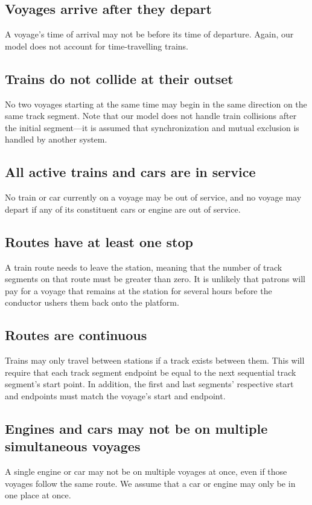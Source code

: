 \documentclass[a4paper]{article}
\begin{document}
\subsection*{Voyages arrive after they depart}
A voyage’s time of arrival may not be before its time of departure. Again, our model does not account for time-travelling trains.

\subsection*{Trains do not collide at their outset}
No two voyages starting at the same time may begin in the same direction on the same track segment. Note that our model does not handle train collisions after the initial segment—it is assumed that synchronization and mutual exclusion is handled by another system.

\subsection*{All active trains and cars are in service}
No train or car currently on a voyage may be out of service, and no voyage may depart if any of its constituent cars or engine are out of service.

\subsection*{Routes have at least one stop}
A train route needs to leave the station, meaning that the number of track segments on that route must be greater than zero. It is unlikely that patrons will pay for a voyage that remains at the station for several hours before the conductor ushers them back onto the platform.

\subsection*{Routes are continuous}
Trains may only travel between stations if a track exists between them. This will require that each track segment endpoint be equal to the next sequential track segment’s start point. In addition, the first and last segments’ respective start and endpoints must match the voyage’s start and endpoint.

\subsection*{Engines and cars may not be on multiple simultaneous voyages}
A single engine or car may not be on multiple voyages at once, even if those voyages follow the same route. We assume that a car or engine may only be in one place at once.
\end{document}
